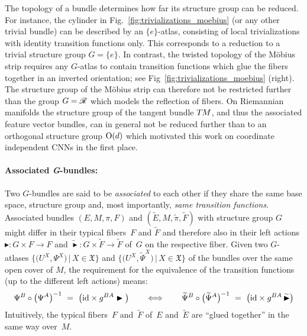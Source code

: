 The topology of a bundle determines how far its structure group can be reduced.
For instance, the cylinder in Fig.~\ref{fig:trivializations_moebius} (or any other trivial bundle) can be described by an $\{e\}$-atlas, consisting of local trivializations with identity transition functions only.
This corresponds to a reduction to a trivial structure group $G=\{e\}$.
In contrast, the twisted topology of the M{\"o}bius strip requires any $G$-atlas to contain transition functions which glue the fibers together in an inverted orientation; see Fig~\ref{fig:trivializations_moebius} (right).
The structure group of the M{\"o}bius strip can therefore not be restricted further than the group $G=\mathscr{R}$ which models the reflection of fibers.
On Riemannian manifolds the structure group of the tangent bundle $T\mkern-1.5muM$, and thus the associated feature vector bundles, can in general not be reduced further than to an orthogonal structure group $\operatorname{O}(d)$ which motivated this work on coordinate independent CNNs in the first place.








\paragraph{Associated \textit{G}-bundles:}
Two $G$-bundles are said to be \emph{associated} to each other if they share the same base space, structure group and, most importantly, \emph{same transition functions}.
Associated bundles $(E,M,\pi,F)$ and $(\widetilde{E},M,\widetilde{\pi},\widetilde{F})$ with structure group $G$ might differ in their typical fibers~$F$ and $\widetilde{F}$ and therefore also in their left actions $\blacktriangleright: G \times F\to F$ and $\widetilde{\blacktriangleright}: G \times \widetilde{F}\to \widetilde{F}$ of~$G$ on the respective fiber.
Given two $G$-atlases
$\big\{\big( U^X,            \Psi^X  \big) \,\big|\, X\in\mathfrak{X} \big\}$ and
$\big\{\big( U^X, \widetilde{\Psi}^X \big) \,\big|\, X\in\mathfrak{X} \big\}$
of the bundles over the same open cover of $M$, the requirement for the equivalence of the transition functions (up to the different left actions) means:
\begin{align}
    \Psi^B \circ \big(\Psi^A \big)^{-1}\ =\ \big(\id \times g^{BA}\blacktriangleright \big)
    \qquad \Longleftrightarrow \qquad
    \widetilde{\Psi}^B \circ \big(\widetilde{\Psi}^A \big)^{-1}\ =\ \big(\id \times g^{BA}\, \widetilde{\blacktriangleright} \big)
\end{align}
Intuitively, the typical fibers~$F$ and~$\widetilde{F}$ of~$E$ and~$\widetilde{E}$ are ``glued together'' in the same way over~$M$.

